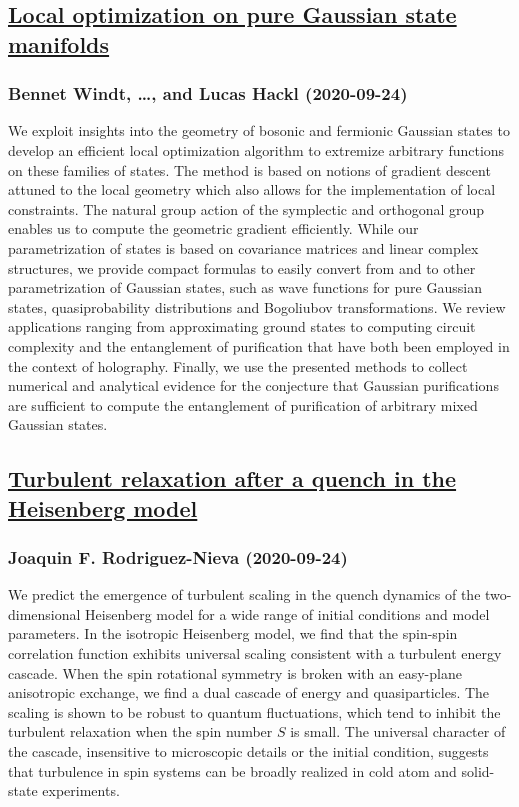 \subsection*{\href{http://arxiv.org/abs/2009.11884v1}{Local optimization on pure Gaussian state manifolds}}
\subsubsection*{Bennet Windt, \dots, and Lucas Hackl (2020-09-24)}
We exploit insights into the geometry of bosonic and fermionic Gaussian
states to develop an efficient local optimization algorithm to extremize
arbitrary functions on these families of states. The method is based on notions
of gradient descent attuned to the local geometry which also allows for the
implementation of local constraints. The natural group action of the symplectic
and orthogonal group enables us to compute the geometric gradient efficiently.
While our parametrization of states is based on covariance matrices and linear
complex structures, we provide compact formulas to easily convert from and to
other parametrization of Gaussian states, such as wave functions for pure
Gaussian states, quasiprobability distributions and Bogoliubov transformations.
We review applications ranging from approximating ground states to computing
circuit complexity and the entanglement of purification that have both been
employed in the context of holography. Finally, we use the presented methods to
collect numerical and analytical evidence for the conjecture that Gaussian
purifications are sufficient to compute the entanglement of purification of
arbitrary mixed Gaussian states.

\subsection*{\href{http://arxiv.org/abs/2009.11883v1}{Turbulent relaxation after a quench in the Heisenberg model}}
\subsubsection*{Joaquin F. Rodriguez-Nieva (2020-09-24)}
We predict the emergence of turbulent scaling in the quench dynamics of the
two-dimensional Heisenberg model for a wide range of initial conditions and
model parameters. In the isotropic Heisenberg model, we find that the spin-spin
correlation function exhibits universal scaling consistent with a turbulent
energy cascade. When the spin rotational symmetry is broken with an easy-plane
anisotropic exchange, we find a dual cascade of energy and quasiparticles. The
scaling is shown to be robust to quantum fluctuations, which tend to inhibit
the turbulent relaxation when the spin number $S$ is small. The universal
character of the cascade, insensitive to microscopic details or the initial
condition, suggests that turbulence in spin systems can be broadly realized in
cold atom and solid-state experiments.

